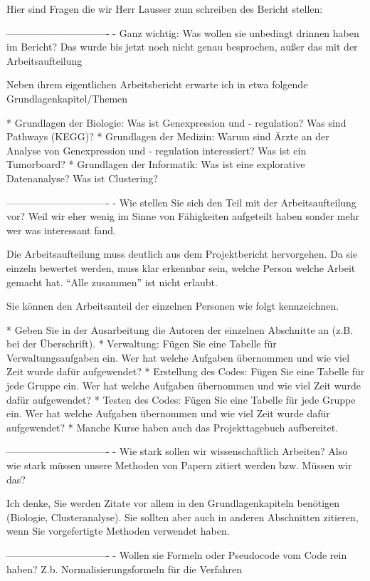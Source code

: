Hier sind Fragen die wir Herr Lausser zum schreiben des Bericht stellen:

-------------------------------
- Ganz wichtig: Was wollen sie unbedingt drinnen haben im Bericht? Das wurde bis jetzt noch nicht genau besprochen, außer das mit der Arbeitsaufteilung

Neben ihrem eigentlichen Arbeitsbericht erwarte ich in etwa folgende Grundlagenkapitel/Themen

* Grundlagen der Biologie: Was ist Genexpression und - regulation? Was sind Pathways (KEGG)?
* Grundlagen der Medizin: Warum sind Ärzte an der Analyse von Genexpression und - regulation interessiert? Was ist ein Tumorboard?
* Grundlagen der Informatik: Was ist eine explorative Datenanalyse? Was ist Clustering?

-------------------------------
- Wie stellen Sie sich den Teil mit der Arbeitsaufteilung vor? Weil wir eher wenig im Sinne von Fähigkeiten aufgeteilt haben sonder mehr wer was interessant fand.

Die Arbeitsaufteilung muss deutlich aus dem Projektbericht hervorgehen. 
Da sie einzeln bewertet werden, muss klar erkennbar sein, welche Person welche Arbeit gemacht hat.
“Alle zusammen” ist nicht erlaubt.

Sie können den Arbeitsanteil der einzelnen Personen wie folgt kennzeichnen.

* Geben Sie in der Ausarbeitung die Autoren der einzelnen Abschnitte an (z.B. bei der Überschrift).
* Verwaltung: Fügen Sie eine Tabelle für Verwaltungsaufgaben ein. Wer hat welche Aufgaben übernommen und wie viel Zeit wurde dafür aufgewendet?
* Erstellung des Codes: Fügen Sie eine Tabelle für jede Gruppe ein. Wer hat welche Aufgaben übernommen und wie viel Zeit wurde dafür aufgewendet?
* Testen des Codes: Fügen Sie eine Tabelle für jede Gruppe ein. Wer hat welche Aufgaben übernommen und wie viel Zeit wurde dafür aufgewendet?
* Manche Kurse haben auch das Projekttagebuch aufbereitet.

-------------------------------
- Wie stark sollen wir wissenschaftlich Arbeiten? Also wie stark müssen unsere Methoden von Papern zitiert werden bzw. Müssen wir das? 

Ich denke, Sie werden Zitate vor allem in den Grundlagenkapiteln benötigen (Biologie, Clusteranalyse).
Sie sollten aber auch in anderen Abschnitten zitieren, wenn Sie vorgefertigte Methoden verwendet haben.

-------------------------------
- Wollen sie Formeln oder Pseudocode vom Code rein haben? Z.b. Normalisierungsformeln für die Verfahren

